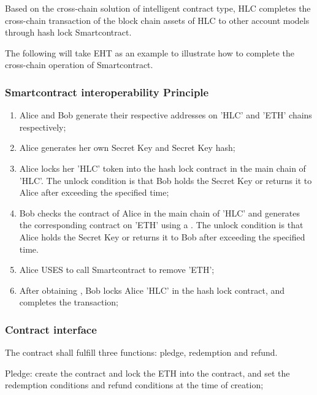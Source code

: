 \documentclass[a4paper,11pt]{article}
\begin{document}
Based on the cross-chain solution of intelligent contract type, HLC completes the cross-chain transaction of the block chain assets of HLC to other account models through hash lock Smartcontract.

The following will take EHT as an example to illustrate how to complete the cross-chain operation of Smartcontract.

\subsubsection*{Smartcontract interoperability Principle} 

\begin{enumerate}
\item  Alice and Bob generate their respective addresses on 'HLC' and 'ETH' chains respectively;

\item   Alice generates her own Secret Key and Secret Key hash;

 \item  Alice locks her 'HLC' token into the hash lock contract in the main chain of 'HLC'. The unlock condition is that Bob holds the Secret Key or returns it to Alice after exceeding the specified time;

 \item  Bob checks the contract of Alice in the main chain of 'HLC' and generates the corresponding contract on 'ETH' using a . The unlock condition is that Alice holds the Secret Key or returns it to Bob after exceeding the specified time.

 \item  Alice USES to call Smartcontract to remove 'ETH';

 \item  After obtaining , Bob locks Alice 'HLC' in the hash lock contract, and completes the transaction;
	
\end{enumerate}

\subsubsection*{Contract interface}

The contract shall fulfill three functions: pledge, redemption and refund.

Pledge: create the contract and lock the ETH into the contract, and set the redemption conditions and refund conditions at the time of creation;
\end{document}
